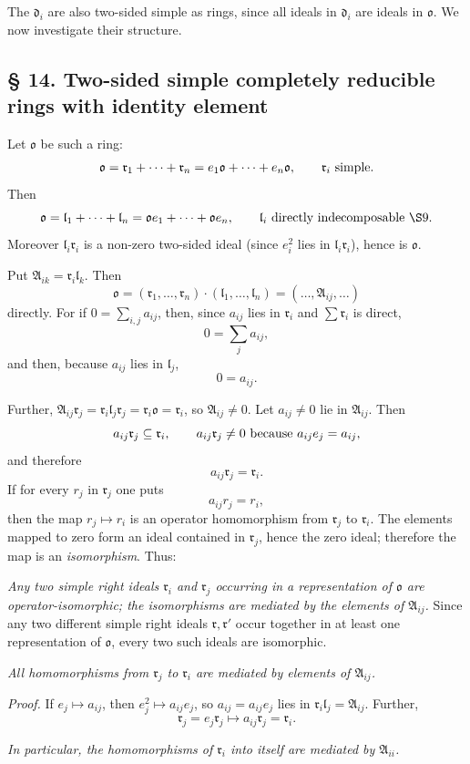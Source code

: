 \documentclass[11pt]{article}
\providecommand{\mA}{\mathfrak{A}}
\providecommand{\mo}{\mathfrak{o}}
\providecommand{\md}{\mathfrak{d}}
\providecommand{\ml}{\mathfrak{l}}
\providecommand{\mr}{\mathfrak{r}}
\begin{document}
The $\md_i$ are also two-sided simple as rings, since all ideals in $\md_i$ are ideals in $\mo$. We now investigate their structure.

\subsection*{§ 14. Two-sided simple completely reducible rings with identity element}

Let $\mo$ be such a ring:
\[
        \mo=\mr_1+\cdots+\mr_n=e_1\mo+\cdots+e_n\mo,
        \qquad \mr_i\hbox{ simple}.
\]
Then
\[
        \mo=\ml_1+\cdots+\ml_n=\mo e_1+\cdots+\mo e_n,
        \qquad \ml_i\hbox{ directly indecomposable }\hbox{\(\S 9\)}.
\]
Moreover $\ml_i\mr_i$ is a non-zero two-sided ideal (since $e_i^2$ lies in $\ml_i\mr_i$), hence is $\mo$.

Put $\mA_{ik}=\mr_i\ml_k$. Then
\[
        \mo=(\mr_1,\ldots,\mr_n)\cdot(\ml_1,\ldots,\ml_n)
        = (\ldots,\mA_{ij},\ldots)
\]
directly. For if $0=\sum_{i,j}a_{ij}$, then, since $a_{ij}$ lies in $\mr_i$ and $\sum\mr_i$ is direct,
\[
        0=\sum_j a_{ij},
\]
and then, because $a_{ij}$ lies in $\ml_j$,
\[
        0=a_{ij}.
\]

Further, $\mA_{ij}\mr_j=\mr_i\ml_j\mr_j=\mr_i\mo=\mr_i$, so $\mA_{ij}\ne0$. Let $a_{ij}\ne0$ lie in $\mA_{ij}$. Then
\[
        a_{ij}\mr_j\subseteq\mr_i,
        \qquad
        a_{ij}\mr_j\ne0 \hbox{ because } a_{ij}e_j=a_{ij},
\]
and therefore
\[
        a_{ij}\mr_j=\mr_i.
\]
If for every $r_j$ in $\mr_j$ one puts
\[
        a_{ij}r_j=r_i,
\]
then the map $r_j\mapsto r_i$ is an operator homomorphism from $\mr_j$ to $\mr_i$. The elements mapped to zero form an ideal contained in $\mr_j$, hence the zero ideal; therefore the map is an \emph{isomorphism}. Thus:

\emph{Any two simple right ideals $\mr_i$ and $\mr_j$ occurring in a representation of $\mo$ are operator-isomorphic; the isomorphisms are mediated by the elements of $\mA_{ij}$.} Since any two different simple right ideals $\mr,\mr'$ occur together in at least one representation of $\mo$, every two such ideals are isomorphic.

\emph{All homomorphisms from $\mr_j$ to $\mr_i$ are mediated by elements of $\mA_{ij}$.}

\emph{Proof.} If $e_j\mapsto a_{ij}$, then $e_j^2\mapsto a_{ij}e_j$, so $a_{ij}=a_{ij}e_j$ lies in $\mr_i\ml_j=\mA_{ij}$. Further,
\[
        \mr_j=e_j\mr_j\mapsto a_{ij}\mr_j=\mr_i.
\]

\emph{In particular, the homomorphisms of $\mr_i$ into itself are mediated by $\mA_{ii}$.}
\end{document}
